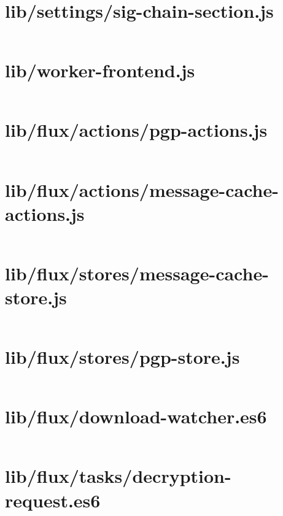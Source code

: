 \documentclass[10pt, letterpaper]{article}
\begin{document}
\section{lib/settings/sig-chain-section.js}
\inputminted{javascript}{/home/mbilker/.nylas/dev/packages/cypher/lib/settings/sig-chain-section.js}

\section{lib/worker-frontend.js}
\inputminted{javascript}{/home/mbilker/.nylas/dev/packages/cypher/lib/worker-frontend.js}

\section{lib/flux/actions/pgp-actions.js}
\inputminted{javascript}{/home/mbilker/.nylas/dev/packages/cypher/lib/flux/actions/pgp-actions.js}

\section{lib/flux/actions/message-cache-actions.js}
\inputminted{javascript}{/home/mbilker/.nylas/dev/packages/cypher/lib/flux/actions/message-cache-actions.js}

\section{lib/flux/stores/message-cache-store.js}
\inputminted{javascript}{/home/mbilker/.nylas/dev/packages/cypher/lib/flux/stores/message-cache-store.js}

\section{lib/flux/stores/pgp-store.js}
\inputminted{javascript}{/home/mbilker/.nylas/dev/packages/cypher/lib/flux/stores/pgp-store.js}

\section{lib/flux/download-watcher.es6}
\inputminted{javascript}{/home/mbilker/.nylas/dev/packages/cypher/lib/flux/download-watcher.es6}

\section{lib/flux/tasks/decryption-request.es6}
\inputminted{javascript}{/home/mbilker/.nylas/dev/packages/cypher/lib/flux/tasks/decryption-request.es6}
\end{document}

